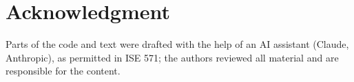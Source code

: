 \documentclass[conference]{IEEEtran}
\begin{document}
\section*{Acknowledgment}
Parts of the code and text were drafted with the help of an AI assistant (Claude, Anthropic), as permitted in ISE 571; the authors reviewed all material and are responsible for the content.



\end{document}
